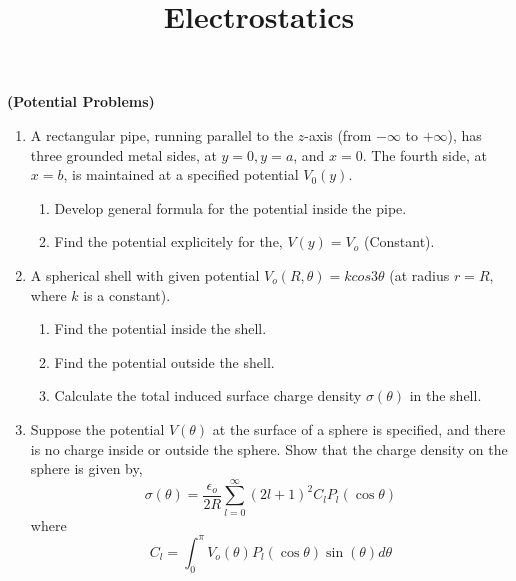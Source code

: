 \documentclass{article}[12pt, a4paper]
\title{Electrostatics}
\newcommand{\gfrac}[2]{\frac{\displaystyle #1}{\displaystyle #2}}
\begin{document}
\centering \textbf{(Potential Problems)}
\begin{enumerate}


\item A rectangular pipe, running parallel to the $z$-axis (from $-\infty$ to $+\infty$),
has three grounded metal sides, at $y = 0, y = a$, and $x = 0$. The fourth side, at
$x = b$, is maintained at a speciﬁed potential $V_0(y)$.
\begin{enumerate}
	\item Develop general formula for the potential inside the pipe.
    \item Find the potential explicitely for the, $V(y) = V_o$ (Constant).
\end{enumerate}

\item A spherical shell with given potential $V_o(R, \theta) = kcos3\theta$ (at radius $r = R$, where $k$ is a constant).
\begin{enumerate}
	\item Find the potential inside the shell.
	\item Find the potential outside the shell.
	\item Calculate the total induced surface charge density $\sigma(\theta)$ in the shell.
\end{enumerate}

\item Suppose the potential $V(\theta)$ at the surface of a sphere is speciﬁed,
and there is no charge inside or outside the sphere. Show that the charge density on
the sphere is given by,
$$
\sigma(\theta) = \gfrac{\epsilon_o}{2R}\sum_{l = 0}^{\infty}(2l + 1)^2C_lP_l(\cos\theta)
$$ where
$$
C_l = \int^{\pi}_{0} V_o(\theta) P_l(\cos\theta) \sin(\theta) d\theta$$


\end{enumerate}
\end{document}
